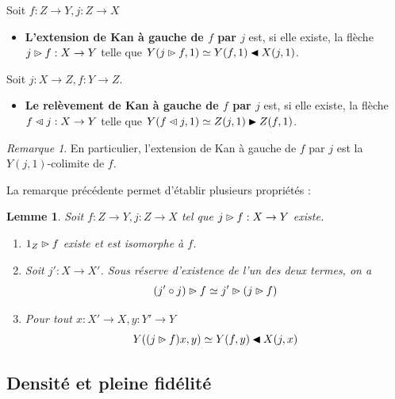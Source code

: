 \documentclass[8pt,a4paper,french,draft]{article}
\newcommand{\flip}[1]{\text{\rotatebox[origin=c]{-180}{$#1$}}}
\newcommand{\rift}{\mathbin{\blacktriangleleft}}
\newcommand{\rext}{\mathbin{\blacktriangleright}}
\newcommand{\plext}{\mathbin{{\rhd}\mathclap{\mspace{-17.5mu}\cdot}}}
\newcommand{\prext}{\mathbin{{\blacktriangleright}\mathclap{\mspace{-17.5mu}\textcolor{white}{\cdot}}}}
\newcommand{\plift}{\mathbin{\flip{{\rhd}\mathclap{\mspace{-17.5mu}\cdot}}}}
\theoremstyle{plain}
\newtheorem{lemma}[theorem]{Lemme}
\theoremstyle{definition}
\theoremstyle{remark}
\newtheorem{remark}[theorem]{Remarque}
\begin{document}
\begin{definition}%
    Soit $f : Z \to Y, j : Z \to X$
    \begin{itemize}
        \item \textbf{L'extension de Kan à gauche de $f$ par $j$} est, si elle existe, la flèche $j\plext f : X \to Y$ telle que $Y(j \plext f, 1) \simeq Y(f, 1) \rift X(j, 1)$.
    \end{itemize}
    Soit $j : X \to Z, f : Y \to Z$.
    \begin{itemize}
        \item \textbf{Le relèvement de Kan à gauche de $f$ par $j$} est, si elle existe, la flèche $f \plift j : X \to Y$ telle que $Y(f\plift j, 1) \simeq Z(j, 1) \rext Z(f, 1)$.
    \end{itemize}
\end{definition}

\begin{remark}\label{rem:kan-ext-colim}
    En particulier, l'extension de Kan à gauche de $f$ par $j$ est la $Y(j, 1)$-colimite de $f$. %
\end{remark}

La remarque précédente permet d'établir plusieurs propriétés :

\begin{lemma}
    Soit $f : Z \to Y, j : Z \to X$ tel que $j \plext f : X \to Y$ existe.
    \begin{enumerate}
        \item $1_Z \plext f$ existe et est isomorphe à $f$.
        \item Soit $j' : X \to X'$. Sous réserve d'existence de l'un des deux termes, on a
            $$(j'\circ j)\plext f \simeq j' \plext (j\plext f)$$
        \item Pour tout $x : X' \to X, y : Y' \to Y$
            $$Y((j\plext f)x, y) \simeq Y(f, y) \rift X(j, x)$$
    \end{enumerate}
\end{lemma}

\subsection{Densité et pleine fidélité}
\end{document}

